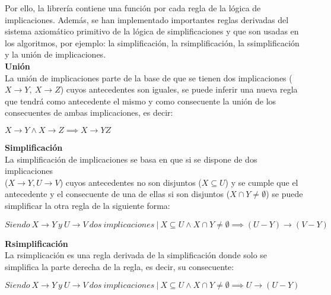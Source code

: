 Por ello, la librer\'ia contiene una funci\'on por cada regla de la l\'ogica de implicaciones. Adem\'as, se han implementado importantes reglas derivadas del sistema axiom\'atico primitivo de la l\'ogica de simplificaciones y que son usadas en los algoritmos, por ejemplo: la simplificaci\'on, la rsimplificaci\'on, la ssimplificaci\'on y la uni\'on de implicaciones.\\

\textbf{Uni\'on}\\
La uni\'on de implicaciones parte de la base de que se tienen dos implicaciones (\(X \to Y, \ X \to Z\)) cuyos antecedentes son iguales, se puede inferir una nueva regla que tendr\'a como antecedente el mismo y como consecuente la uni\'on de los consecuentes de ambas implicaciones, es decir:

\begin{center}
    \(X \to Y \wedge X \to Z \implies X \to YZ \)
\end{center}


\bigskip
\textbf{Simplificaci\'on}\\
La simplificaci\'on de implicaciones se basa en que si se dispone de dos implicaciones \\ (\(X \to Y , U \to V\)) cuyos antecedentes no son disjuntos (\(X \subseteq U\)) y se cumple que el antecedente y el consecuente de una de ellas si son disjuntos (\(X \cap Y \neq \emptyset\)) se puede simplificar la otra regla de la siguiente forma:

\begin{center}
    \(Siendo \ X \to Y \ y \ U\to V \ dos \ implicaciones \ | \ X \subseteq U \wedge X \cap Y \neq \emptyset \implies (U - Y) \to (V - Y)\)
\end{center}


\bigskip
\textbf{Rsimplificaci\'on}\\
La rsimplicaci\'on es una regla derivada de la simplificaci\'on donde solo se simplifica la parte derecha de la regla, es decir, su consecuente:

\begin{center}
    \(Siendo \ X \to Y \ y \ U\to V \ dos \ implicaciones \ | \ X \subseteq U \wedge X \cap Y \neq \emptyset \implies U \to (U - Y)\)
\end{center}


\bigskip

